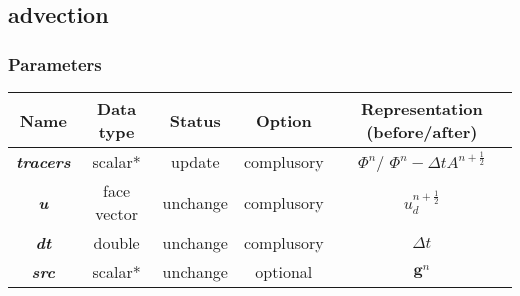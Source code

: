 \documentclass[a4paper]{article}
\newcommand{\func}[1]{\textbf{\textcolor{function}{#1}}}
\newcommand{\para}[1]{\textbf{\emph{\textcolor{para}{#1}}}}
\begin{document}
\subsection{\func{advection}}

\subsubsection{Parameters}
\begin{center}
  \begin{tabular}{|c|c|c|c|c|}
    \hline
    Name & Data type & Status & Option & Representation (before/after)\\[0.5ex]
    \hline\hline
    \rowcolor{output} \para{tracers} & scalar* & update & complusory & $\Phi^n$/ $\Phi^n-\Delta t A^{n+ \frac{1}{2}}$\\
    \hline
    \para{u} & face vector & unchange & complusory & $u_d^{n+ \frac{1}{2}}$\\
    \hline
    \para{dt} & double & unchange & complusory & $\Delta t$\\
    \hline
    \para{src} & scalar* & unchange & optional & $ \mathbf{g}^n$ \\
    \hline
  \end{tabular}
\end{center}
\end{document}
